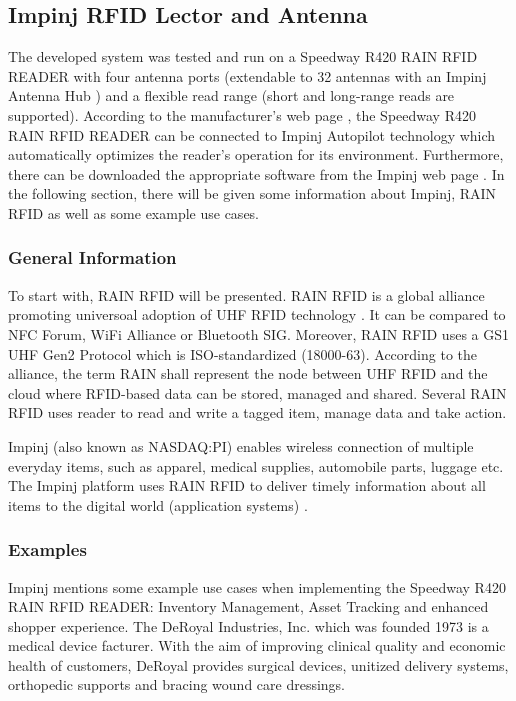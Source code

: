 \subsection{Impinj RFID Lector and Antenna}

The developed system was tested and run on a Speedway R420 RAIN RFID READER \cite{speedway} with four antenna ports (extendable to 32 antennas with an Impinj Antenna Hub \cite{speedway}) and a flexible read range (short and long-range reads are supported). According to the manufacturer's web page \cite{speedway}, the Speedway R420 RAIN RFID READER can be connected to Impinj Autopilot technology which automatically optimizes the reader's operation for its environment. Furthermore, there can be downloaded the appropriate software from the Impinj web page \cite{speedway}.
In the following section, there will be given some information about Impinj, RAIN RFID as well as some example use cases. 

\subsubsection{General Information}

To start with, RAIN RFID will be presented. RAIN RFID is a global alliance promoting universoal adoption of UHF RFID technology \cite{rainrfid}. It can be compared to NFC Forum, WiFi Alliance or Bluetooth SIG. Moreover, RAIN RFID uses a GS1 UHF Gen2 Protocol which is ISO-standardized (18000-63). According to the alliance, the term RAIN shall represent the node between UHF RFID and the cloud where RFID-based data can be stored, managed and shared. Several RAIN RFID uses reader to read and write a tagged item, manage data and take action.

Impinj (also known as NASDAQ:PI) enables wireless connection of multiple everyday items, such as apparel, medical supplies, automobile parts, luggage etc. The Impinj platform uses RAIN RFID to deliver timely information about all items to the digital world (application systems) \cite{impinj}.

\subsubsection{Examples}

Impinj mentions some example use cases when implementing the Speedway R420 RAIN RFID READER: Inventory Management, Asset Tracking and enhanced shopper experience. 
The DeRoyal Industries, Inc. which was founded 1973 is a medical device facturer\cite{deroyal}. With the aim of improving clinical quality and economic health of customers, DeRoyal provides surgical devices, unitized delivery systems, orthopedic supports and bracing wound care dressings.

